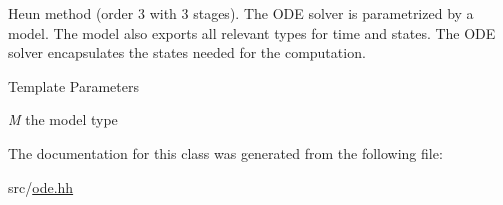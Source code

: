 Heun method (order 3 with 3 stages). The ODE solver is parametrized by a model. The model also exports all relevant types for time and states. The ODE solver encapsulates the states needed for the computation.


\begin{DoxyTemplParams}{Template Parameters}
\item[{\em M}]the model type \end{DoxyTemplParams}


The documentation for this class was generated from the following file:\begin{DoxyCompactItemize}
\item 
src/\hyperlink{ode_8hh}{ode.hh}\end{DoxyCompactItemize}

